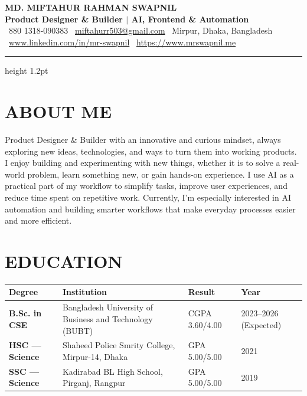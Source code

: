 \documentclass[10pt, a4paper]{article}
\begin{document}
\begin{center}
    {\Huge \textbf{MD. MIFTAHUR RAHMAN SWAPNIL}} \\ \vspace{2pt}
    {\large \textbf{Product Designer \& Builder $|$ AI, Frontend \& Automation}} \\ \vspace{5pt}
    \small{
        \faPhone*~880 1318-090383 \quad
        \faEnvelope~\href{mailto:miftahurr503@gmail.com}{miftahurr503@gmail.com} \quad
        \faMapMarker*~Mirpur, Dhaka, Bangladesh \\ \vspace{3pt}
        \faLinkedin~\href{https://www.linkedin.com/in/mr-swapnil}{www.linkedin.com/in/mr-swapnil} \quad
        \faGlobe~\href{https://www.mrswapnil.me}{https://www.mrswapnil.me}
    }
\end{center}
\vspace{-6pt}
{\color{ruleBlack}\hrule height 1.2pt}
\vspace{2pt}

\section{ABOUT ME}
\small{
Product Designer \& Builder with an innovative and curious mindset, always exploring new ideas, technologies, and ways to turn them into working products. I enjoy building and experimenting with new things, whether it is to solve a real-world problem, learn something new, or gain hands-on experience. I use AI as a practical part of my workflow to simplify tasks, improve user experiences, and reduce time spent on repetitive work. Currently, I’m especially interested in AI automation and building smarter workflows that make everyday processes easier and more efficient.
}
\vspace{3pt}

\section{EDUCATION}
\vspace{2pt}
\begin{tabular}{|p{3.5cm}|p{8.5cm}|p{3.0cm}|p{2.2cm}|}
\hline
\textbf{Degree} & \textbf{Institution} & \textbf{Result} & \textbf{Year} \\
\hline
\textbf{B.Sc. in CSE} & Bangladesh University of Business and Technology (BUBT) & CGPA 3.60/4.00 & 2023--2026 (Expected) \\
\hline
\textbf{HSC --- Science} & Shaheed Police Smrity College, Mirpur-14, Dhaka & GPA 5.00/5.00 & 2021 \\
\hline
\textbf{SSC --- Science} & Kadirabad BL High School, Pirganj, Rangpur & GPA 5.00/5.00 & 2019 \\
\hline
\end{tabular}
\vspace{4pt}
\end{document}
